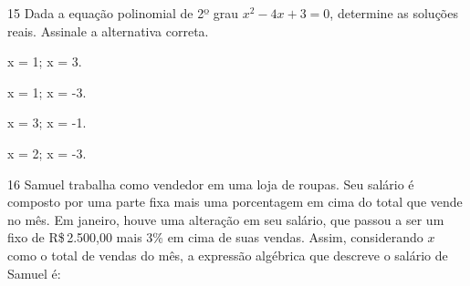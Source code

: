 





\pagebreak

\num{15} Dada a equação polinomial de 2º grau $x^2 - 4x + 3 = 0$, determine as
soluções reais. Assinale a alternativa correta.

\begin{escolha}
\item
  x = 1; x = 3.
\item
  x = 1; x = -3.
\item
  x = 3; x = -1.
\item
  x = 2; x = -3.
\end{escolha}








\num{16} Samuel trabalha como vendedor em uma loja de roupas. Seu salário é
composto por uma parte fixa mais uma porcentagem em cima do total que
vende no mês. Em janeiro, houve uma alteração em seu salário, que passou
a ser um fixo de R\$\,2.500,00 mais 3\% em cima de suas vendas. Assim,
considerando $x$ como o total de vendas do mês, a expressão algébrica
que descreve o salário de Samuel é:

